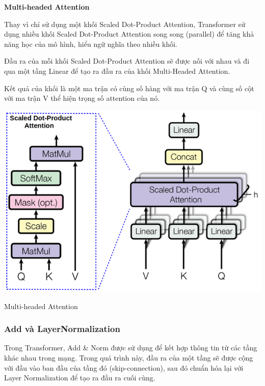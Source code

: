 \documentclass[a4paper, 12pt, openany]{book}
\begin{document}
\textbf{Multi-headed Attention}

Thay vì chỉ sử dụng một khối Scaled Dot-Product Attention, Transformer sử dụng
nhiều khối Scaled Dot-Product Attention song song (parallel) để tăng khả năng học của mô hình, hiểu ngữ nghĩa theo nhiều khối.

Đầu ra của mỗi khối Scaled Dot-Product Attention sẽ được nối với nhau và đi qua một tầng Linear để tạo ra đầu ra của khối Multi-Headed Attention.

Kết quả của khối là một ma trận có cùng số hàng với ma trận Q và cùng số cột với ma trận V thể hiện trọng số attention của nó.

\begin{minipage}{\linewidth}
    \captionsetup{type=figure}
    \centering
    \includegraphics[width=.6\linewidth]{./assets/images/MultiHead.png}
    \caption{Multi-headed Attention\cite{vaswani2023attention}}
\end{minipage}

\subsubsection{Add và LayerNormalization}
Trong Transformer, Add \& Norm được sử dụng để kết hợp thông tin
từ các tầng khác nhau trong mạng. Trong quá trình này, đầu ra của một tầng sẽ được
cộng với đầu vào ban đầu của tầng đó (skip-connection), sau đó chuẩn hóa lại với Layer
Normalization để tạo ra đầu ra cuối cùng.
\end{document}
